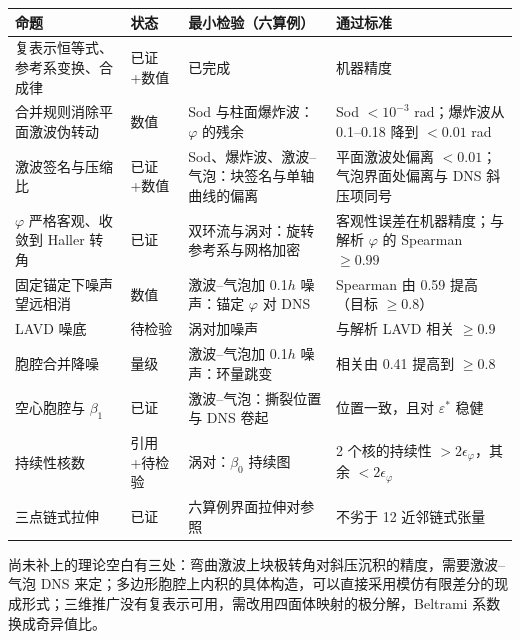 \documentclass[10.5pt,a4paper]{article}
\theoremstyle{definition}
\theoremstyle{plain}
\theoremstyle{remark}
\begin{document}
\begin{center}\small
\begin{xltabular}{\linewidth}{@{}P{4.3cm}P{1.9cm}LP{2.6cm}@{}}
\toprule
命题 & 状态 & 最小检验（六算例） & 通过标准\\\midrule
复表示恒等式、参考系变换、合成律 & 已证+数值 & 已完成 & 机器精度\\
合并规则消除平面激波伪转动 & 数值 & Sod 与柱面爆炸波：$\varphi$ 的残余 & Sod $<10^{-3}$ rad；爆炸波从 0.1–0.18 降到 $<0.01$ rad\\
激波签名与压缩比 & 已证+数值 & Sod、爆炸波、激波–气泡：块签名与单轴曲线的偏离 & 平面激波处偏离 $<0.01$；气泡界面处偏离与 DNS 斜压项同号\\
$\varphi$ 严格客观、收敛到 Haller 转角 & 已证 & 双环流与涡对：旋转参考系与网格加密 & 客观性误差在机器精度；与解析 $\varphi$ 的 Spearman $\ge0.99$\\
固定锚定下噪声望远相消 & 数值 & 激波–气泡加 0.1$h$ 噪声：锚定 $\varphi$ 对 DNS & Spearman 由 0.59 提高（目标 $\ge0.8$）\\
LAVD 噪底 & 待检验 & 涡对加噪声 & 与解析 LAVD 相关 $\ge0.9$\\
胞腔合并降噪 & 量级 & 激波–气泡加 0.1$h$ 噪声：环量跳变 & 相关由 0.41 提高到 $\ge0.8$\\
空心胞腔与 $\beta_1$ & 已证 & 激波–气泡：撕裂位置与 DNS 卷起 & 位置一致，且对 $\varepsilon^*$ 稳健\\
持续性核数 & 引用+待检验 & 涡对：$\beta_0$ 持续图 & 2 个核的持续性 $>2\epsilon_\varphi$，其余 $<2\epsilon_\varphi$\\
三点链式拉伸 & 已证 & 六算例界面拉伸对参照 & 不劣于 12 近邻链式张量\\
\bottomrule
\end{xltabular}\end{center}

尚未补上的理论空白有三处：弯曲激波上块极转角对斜压沉积的精度，需要激波–气泡 DNS 来定；多边形胞腔上内积的具体构造，可以直接采用模仿有限差分的现成形式；三维推广没有复表示可用，需改用四面体映射的极分解，Beltrami 系数换成奇异值比。
\end{document}

